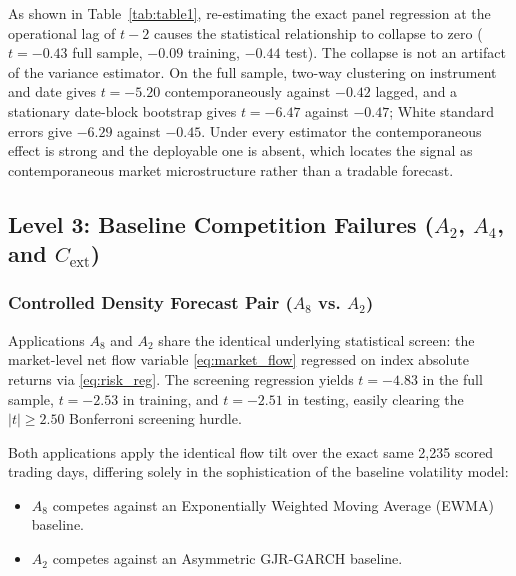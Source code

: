 \documentclass{ieeeaccess}
\begin{document}
As shown in Table~\ref{tab:table1}, re-estimating the exact panel regression at the operational lag of $t-2$ causes the statistical relationship to collapse to zero ($t = -0.43$ full sample, $-0.09$ training, $-0.44$ test). The collapse is not an artifact of the variance estimator. On the full sample, two-way clustering on instrument and date gives $t = -5.20$ contemporaneously against $-0.42$ lagged, and a stationary date-block bootstrap gives $t = -6.47$ against $-0.47$; White standard errors give $-6.29$ against $-0.45$. Under every estimator the contemporaneous effect is strong and the deployable one is absent, which locates the signal as contemporaneous market microstructure rather than a tradable forecast.

\subsection{Level 3: Baseline Competition Failures ($A_2$, $A_4$, and $C_{\text{ext}}$)}

\subsubsection{Controlled Density Forecast Pair ($A_8$ vs. $A_2$)}
Applications $A_8$ and $A_2$ share the identical underlying statistical screen: the market-level net flow variable \eqref{eq:market_flow} regressed on index absolute returns via \eqref{eq:risk_reg}. The screening regression yields $t = -4.83$ in the full sample, $t = -2.53$ in training, and $t = -2.51$ in testing, easily clearing the $|t| \ge 2.50$ Bonferroni screening hurdle.

Both applications apply the identical flow tilt over the exact same 2,235 scored trading days, differing solely in the sophistication of the baseline volatility model:
\begin{itemize}
    \item $A_8$ competes against an Exponentially Weighted Moving Average (EWMA) baseline.
    \item $A_2$ competes against an Asymmetric GJR-GARCH baseline.
\end{itemize}
\end{document}
